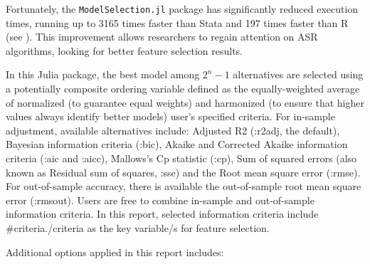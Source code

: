 \documentclass{article}
\begin{document}
Fortunately, the \verb|ModelSelection.jl| package has significantly reduced execution times, running up to 3165 times faster than Stata and 197 times faster than R (see \cite{gsreg2019}). This improvement allows researchers to regain attention on ASR algorithms, looking for better feature selection results.

In this Julia package, the best model among $2^{n}-1$ alternatives are selected using a potentially composite ordering variable defined as the equally-weighted average of normalized (to guarantee equal weights) and harmonized (to ensure that higher values always identify better models) user's specified criteria. For in-sample adjustment, available alternatives include: Adjusted R2 (:r2adj, the default), Bayesian information criteria (:bic), Akaike and Corrected Akaike information criteria (:aic and :aicc), Mallows's Cp statistic (:cp), Sum of squared errors (also known as Residual sum of squares, :sse) and the Root mean square error (:rmse). For out-of-sample accuracy, there is available the out-of-sample root mean square error (:rmsout). Users are free to combine in-sample and out-of-sample information criteria. In this report, selected information criteria include {{#criteria}}{{.}}{{/criteria}} as the key variable/s for feature selection.

Additional options applied in this report includes:
\end{document}
